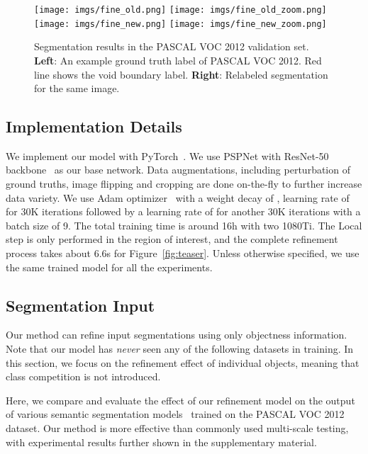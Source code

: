 \documentclass[10pt,twocolumn,letterpaper]{article}
\begin{document}
\begin{figure}[t]
\centering
	\texttt{[image: imgs/fine\_old.png]}
	\endminipage \hfill
	\texttt{[image: imgs/fine\_old\_zoom.png]}
	\endminipage \hfill
	\texttt{[image: imgs/fine\_new.png]}
	\endminipage \hfill
	\texttt{[image: imgs/fine\_new\_zoom.png]}
	\endminipage \hfill
	\caption{Segmentation results in the PASCAL VOC 2012 validation set. \textbf{Left}: An example ground truth label of PASCAL VOC 2012. Red line shows the void boundary label.
	\textbf{Right}: Relabeled segmentation for the same image.}
	\label{fig:fine}
	\vspace{-0.15in}
\end{figure}

\subsection{Implementation Details}
We implement our model with PyTorch~\cite{paszke2017automatic}. We use PSPNet with  ResNet-50 backbone~\cite{zhao2017pyramid} as our base network. Data augmentations, including perturbation of ground truths, image flipping and cropping are done on-the-fly to further increase data variety. We use Adam optimizer~\cite{kingma2014adam} with a weight decay of , learning rate of  for 30K iterations followed by a learning rate of  for another 30K iterations with a batch size of 9. The total training time is around 16h with two 1080Ti. The Local step is only performed in the region of interest, and the complete refinement process takes about 6.6s for Figure~\ref{fig:teaser}. 
Unless otherwise specified, we use the same trained model for all the experiments. 

\subsection{Segmentation Input}
Our method can refine input segmentations using only objectness information. Note that our model has \textit{never} seen any of the following datasets in training. In this section, we focus on the refinement effect of individual objects, meaning that class competition is not introduced. 

Here, we compare and evaluate the effect of our refinement model on the output of various semantic segmentation models~\cite{chen2018encoder, zhao2017pyramid} trained on the PASCAL VOC 2012 dataset. Our method is more effective than commonly used multi-scale testing, with experimental results further shown in the supplementary material.
\end{document}
